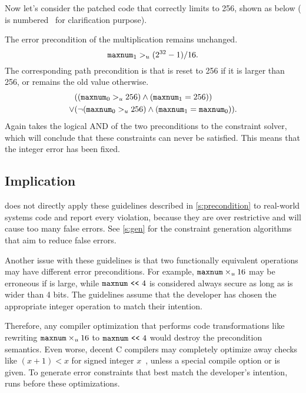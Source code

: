 Now let's consider the patched code that correctly limits 
to 256, shown as below ( is
numbered~\cite[\chapterautorefname~8.11]{whale} for clarification
purpose).

The error precondition of the multiplication remains unchanged.
\begin{equation*}
\texttt{maxnum}_1 >_u (2^{32} - 1) / 16.
\end{equation*}
The corresponding path precondition is that  is reset to 256
if it is larger than 256, or remains the old value otherwise.
\begin{align*}
& ((\texttt{maxnum}_0 >_u 256) \land (\texttt{maxnum}_1 = 256)) \\
\lor
& (\neg (\texttt{maxnum}_0 >_u 256) \land (\texttt{maxnum}_1 = \texttt{maxnum}_0)).
\end{align*}
Again \sys takes the logical AND of the two preconditions to the
constraint solver, which will conclude that these constraints can
never be satisfied.  This means that the integer error has been
fixed.

\subsection{Implication}
\label{s:imply}

\sys does not directly apply these guidelines described in
\autoref{s:precondition} to real-world systems code and report every
violation, because they are over restrictive and will cause too
many false errors.  See \autoref{s:gen} for the constraint generation
algorithms that aim to reduce false errors.

Another issue with these guidelines is that two functionally
equivalent operations may have different error preconditions.  For
example, $\texttt{maxnum}\times_u 16$ may be erroneous if 
is large, while $\texttt{maxnum} \ \texttt{<}\texttt{<}\  4$ is considered always secure
as long as  is wider than 4 bits.  The guidelines assume
that the developer has chosen the appropriate integer operation to
match their intention.

Therefore, any compiler optimization that performs code transformations
like rewriting $\texttt{maxnum}\times_u 16$ to $\texttt{maxnum} \ \texttt{<}\texttt{<}\  4$
would destroy the precondition semantics.  Even worse, decent C
compilers may completely optimize away checks like $(x + 1) < x$
for signed integer $x$~\cite{gcc:signed-overflow,us-cert:gcc},
unless a special compile option  or 
is given.  To generate error constraints that best match the
developer's intention, \sys runs before these optimizations.

